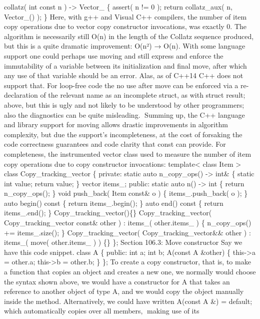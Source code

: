 collatz( int const n ) -\textgreater{} Vector\_ \{ assert( n != 0 );
return collatz\_aux( n, Vector\_() ); \} Here, with g++ and Visual C++
compilers, the number of item copy operations due to vector copy
constructor invocations, was exactly 0. The algorithm is necessarily
still O(n) in the length of the Collatz sequence produced, but this is a
quite dramatic improvement: O(n²) → O(n). With some language support one
could perhaps use moving and still express and enforce the immutability
of a variable between its initialization and ﬁnal move, after which any
use of that variable should be an error. Alas, as of C++14 C++ does not
support that. For loop-free code the no use after move can be enforced
via a re-declaration of the relevant name as an incomplete struct, as
with struct result; above, but this is ugly and not likely to be
understood by other programmers; also the diagnostics can be quite
misleading. Summing up, the C++ language and library support for moving
allows drastic improvements in algorithm complexity, but due the
support's incompleteness, at the cost of forsaking the code correctness
guarantees and code clarity that const can provide. For completeness,
the instrumented vector class used to measure the number of item copy
operations due to copy constructor invocations: template\textless{}
class Item \textgreater{} class Copy\_tracking\_vector \{ private:
static auto n\_copy\_ops() -\textgreater{} int\& \{ static int value;
return value; \} vector items\_; public: static auto n() -\textgreater{}
int \{ return n\_copy\_ops(); \} void push\_back( Item const\& o ) \{
items\_.push\_back( o ); \} auto begin() const \{ return
items\_.begin(); \} auto end() const \{ return items\_.end(); \}
Copy\_tracking\_vector()\{\} Copy\_tracking\_vector(
Copy\_tracking\_vector const\& other ) : items\_( other.items\_ ) \{
n\_copy\_ops() += items\_.size(); \} Copy\_tracking\_vector(
Copy\_tracking\_vector\&\& other ) : items\_( move( other.items\_ ) )
\{\} \}; Section 106.3: Move constructor Say we have this code snippet.
class A \{ public: int a; int b; A(const A \&other) \{
this-\textgreater a = other.a; this-\textgreater b = other.b; \} \}; To
create a copy constructor, that is, to make a function that copies an
object and creates a new one, we normally would choose the syntax shown
above, we would have a constructor for A that takes an reference to
another object of type A, and we would copy the object manually inside
the method. Alternatively, we could have written A(const A \&) =
default; which automatically copies over all members, making use of its
